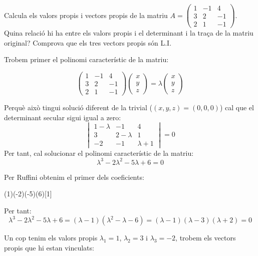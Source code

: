 \Exercise[title=Vectors i valors propis en una matriu $3\times 3$\medskip] 
\vspace{\baselineskip}
Calcula els valors propis i vectors propis de la matriu $A=\begin{pmatrix}1&-1&4\\3&2&-1\\2&1&-1\end{pmatrix}$. Quina relació hi ha entre els valors propis i el determinant i la traça de la matriu original? Comprova que els tres vectors propis són L.I.  

\Answer

Trobem primer el polinomi característic de la matriu:

\[
  \begin{pmatrix}1&-1&4\\3&2&-1\\2&1&-1\end{pmatrix}
  \begin{pmatrix}x\\y\\z\end{pmatrix}=\lambda\begin{pmatrix}x\\y\\z\end{pmatrix}\]

  Perquè això tingui solució diferent de la trivial ($(x,y,z)=(0,0,0)$) cal que el determinant secular sigui igual a zero:
  \[
  \begin{vmatrix}1-\lambda&-1&4\\3&2-\lambda&1\\-2&-1&\lambda+1\end{vmatrix}=0  
  \]
  Per tant, cal solucionar el polinomi característic de la matriu:
  \[\lambda^3-2\lambda^2-5\lambda+6=0\]

  Per Ruffini obtenim el primer dels coeficients:
  
  \begin{center}
  \Ruffini(1)(-2)(-5)(6)[1]
  \end{center}
  Per tant:
  \[\lambda^3-2\lambda^2-5\lambda+6=(\lambda-1)(\lambda^2-\lambda-6)=(\lambda-1)(\lambda-3)(\lambda+2)=0\]


Un cop tenim els valors propis $\lambda_1=1$, $\lambda_2=3$ i $\lambda_3=-2$, trobem els vectors propis que hi estan vinculats:

